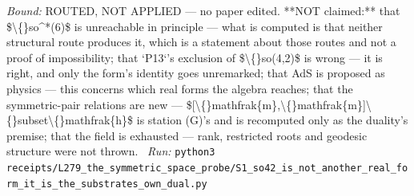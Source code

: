 \begin{description}
 \emph{Bound:} ROUTED, NOT APPLIED --- no paper edited. **NOT claimed:** that \$\textbackslash\{\}so\textasciicircum{}*(6)\$ is unreachable in principle --- what is computed is that neither structural route produces it, which is a statement about those routes and not a proof of impossibility; that `P13`'s exclusion of \$\textbackslash\{\}so(4,2)\$ is wrong --- it is right, and only the form's identity goes unremarked; that AdS is proposed as physics --- this concerns which real forms the algebra reaches; that the symmetric-pair relations are new --- \$[\textbackslash\{\}mathfrak\{m\},\textbackslash\{\}mathfrak\{m\}]\textbackslash\{\}subset\textbackslash\{\}mathfrak\{h\}\$ is station (G)'s and is recomputed only as the duality's premise; that the field is exhausted --- rank, restricted roots and geodesic structure were not thrown.
\ \emph{Run:} \texttt{python3 receipts/L279\_the\_symmetric\_space\_probe/S1\_so42\_is\_not\_another\_real\_form\_it\_is\_the\_substrates\_own\_dual.py}
\end{description}\endgroup
